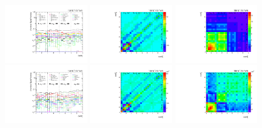 \begin{figure}[htb]
\begin{center}
 \includegraphics[width=0.32\textwidth]{fig_fullRun2UL/unfolding/combined/deltaSystCombinedlog_rebinnedB_b2n_mttbar.pdf}
 \includegraphics[width=0.32\textwidth]{fig_fullRun2UL/unfolding/combined/StatCovMatrix_rebinnedB_b2n_mttbar.pdf}
 \includegraphics[width=0.32\textwidth]{fig_fullRun2UL/unfolding/combined/TotalSystCovMatrix_rebinnedB_b2n_mttbar.pdf} \\
 \includegraphics[width=0.32\textwidth]{fig_fullRun2UL/unfolding/combined/deltaSystCombinedlogNorm_rebinnedB_b2n_mttbar.pdf}
 \includegraphics[width=0.32\textwidth]{fig_fullRun2UL/unfolding/combined/StatCovMatrixNorm_rebinnedB_b2n_mttbar.pdf}
 \includegraphics[width=0.32\textwidth]{fig_fullRun2UL/unfolding/combined/TotalSystCovMatrixNorm_rebinnedB_b2n_mttbar.pdf} \\

\end{center}
\end{figure}
